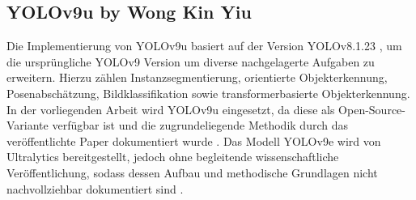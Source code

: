 
\subsection{YOLOv9u by Wong Kin Yiu}
\label{subsec:yolov9u}

Die Implementierung von \acrshort{YOLO}v9u basiert auf der Version \acrshort{YOLO}v8.1.23 \cite{yolo_v9u_github}, um die ursprüngliche \acrshort{YOLO}v9 Version um diverse nachgelagerte Aufgaben zu erweitern. Hierzu zählen Instanzsegmentierung, orientierte Objekterkennung, Posenabschätzung, Bildklassifikation sowie transformerbasierte Objekterkennung\cite{wang2024}. In der vorliegenden Arbeit wird \acrshort{YOLO}v9u eingesetzt, da diese als Open-Source-Variante verfügbar ist und die zugrundeliegende Methodik durch das veröffentlichte Paper dokumentiert wurde \cite{wang2024_sapkota}. Das Modell \acrshort{YOLO}v9e wird von Ultralytics bereitgestellt, jedoch ohne begleitende wissenschaftliche Veröffentlichung, sodass dessen Aufbau und methodische Grundlagen nicht nachvollziehbar dokumentiert sind \cite{ultralyics_2023}.

 



